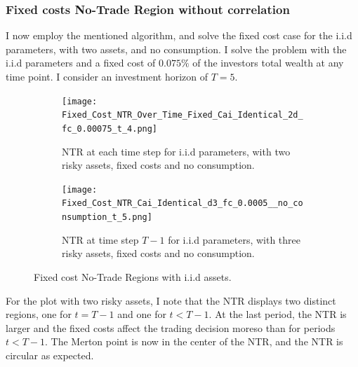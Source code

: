 \documentclass[11pt]{article}
\begin{document}
\subsubsection{Fixed costs No-Trade Region without correlation} \label{Subsubsection: FixedCostNoCorrelation}
I now employ the mentioned algorithm, and solve the fixed cost case for the i.i.d parameters, with two assets, and no consumption.
I solve the problem with the i.i.d parameters and a fixed cost of $0.075\%$ of the investors total wealth at any time point. 
I consider an investment horizon of $T = 5$.

\begin{figure}[!ht]
    \centering
    \begin{subfigure}[t]{0.48\textwidth}
        \centering
        \texttt{[image: Fixed\_Cost\_NTR\_Over\_Time\_Fixed\_Cai\_Identical\_2d\_fc\_0.00075\_t\_4.png]}
        \caption{NTR at each time step for i.i.d parameters, with two risky assets, fixed costs and no consumption.}
        \label{fig:Fixed_NTR_2d_iid_over_time}
    
    \end{subfigure}%
    \hfill
    \begin{subfigure}[t]{0.48\textwidth}
        \centering
        \texttt{[image: Fixed\_Cost\_NTR\_Cai\_Identical\_d3\_fc\_0.0005\_\_no\_consumption\_t\_5.png]}
        \caption{NTR at time step $T-1$ for i.i.d parameters, with three risky assets, fixed costs and no consumption.}
        \label{fig:NTR_3d_iid_T-1}
    \end{subfigure}
    \caption{Fixed cost No-Trade Regions with i.i.d assets.}
\end{figure}
\FloatBarrier

For the plot with two risky assets, I note that the NTR displays two distinct regions, one for $t = T-1$ and one for $t < T-1$.
At the last period, the NTR is larger and the fixed costs affect the trading decision moreso than for periods $t < T-1$.
The Merton point is now in the center of the NTR, and the NTR is circular as expected.
\end{document}
